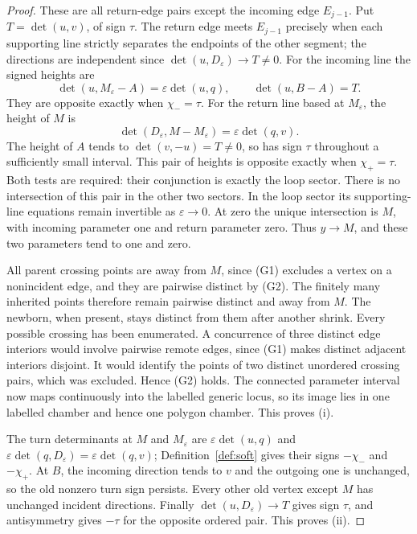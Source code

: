 \begin{proof}
These are all return-edge pairs except the incoming edge
$E_{j-1}$. Put $T=\det(u,v)$, of sign $\tau$. The return
edge meets $E_{j-1}$ precisely when each supporting line
strictly separates the endpoints of the other segment; the
directions are independent since $\det(u,D_\varepsilon)\to T\ne0$.
For the incoming line the signed heights are
\begin{equation}\label{eq:soft-first-straddle}
\det(u,M_\varepsilon-A)=\varepsilon\det(u,q),\qquad
\det(u,B-A)=T.
\end{equation}
They are opposite exactly when $\chi_-=\tau$. For the return
line based at $M_\varepsilon$, the height of $M$ is
\begin{equation}\label{eq:soft-second-straddle}
\det(D_\varepsilon,M-M_\varepsilon)
=\varepsilon\det(q,v).
\end{equation}
The height of $A$ tends to $\det(v,-u)=T\ne0$, so has sign
$\tau$ throughout a sufficiently small interval. This pair of
heights is opposite exactly when $\chi_+=\tau$. Both tests
are required: their conjunction is exactly the loop sector.
There is no intersection of this pair in the other two sectors.
In the loop sector its supporting-line equations remain
invertible as $\varepsilon\to0$. At zero the unique intersection
is $M$, with incoming parameter one and return parameter zero.
Thus $y\to M$, and these two parameters tend to one and zero.

All parent crossing points are away from $M$, since (G1)
excludes a vertex on a nonincident edge, and they are pairwise
distinct by (G2). The finitely many inherited points therefore
remain pairwise distinct and away from $M$. The newborn, when
present, stays distinct from them after another shrink.
Every possible crossing has been enumerated. A concurrence of
three distinct edge interiors would involve pairwise remote
edges, since (G1) makes distinct adjacent interiors disjoint.
It would identify the points of two distinct unordered crossing
pairs, which was excluded. Hence (G2) holds. The connected
parameter interval now maps continuously into the labelled
generic locus, so its image lies in one labelled chamber and
hence one polygon chamber. This proves (i).

The turn determinants at $M$ and $M_\varepsilon$ are
$\varepsilon\det(u,q)$ and
$\varepsilon\det(q,D_\varepsilon)=\varepsilon\det(q,v)$;
Definition~\ref{def:soft} gives their signs $-\chi_-$ and
$-\chi_+$. At $B$, the incoming direction tends to $v$ and
the outgoing one is unchanged, so the old nonzero turn sign
persists. Every other old vertex except $M$ has unchanged
incident directions. Finally $\det(u,D_\varepsilon)\to T$
gives sign $\tau$, and antisymmetry gives $-\tau$ for the
opposite ordered pair. This proves (ii).


\end{proof}

